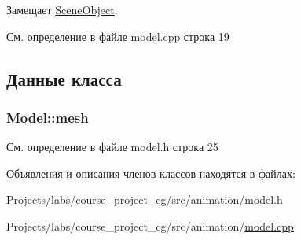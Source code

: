 Замещает \hyperlink{class_scene_object_a1b8a4b90f1200f1cd025d95964d43630}{Scene\+Object}.



См. определение в файле model.\+cpp строка 19



\subsection{Данные класса}
\subsubsection[{\texorpdfstring{mesh}{mesh}}]{ Model\+::mesh\hspace{0.3cm}{\ttfamily [private]}}\hypertarget{class_model_a3d4bb8dadc8b8fa5513cd052ccc2276e}{}\label{class_model_a3d4bb8dadc8b8fa5513cd052ccc2276e}


См. определение в файле model.\+h строка 25



Объявления и описания членов классов находятся в файлах\+:\begin{DoxyCompactItemize}
\item 
Projects/labs/course\+\_\+project\+\_\+cg/src/animation/\hyperlink{model_8h}{model.\+h}\item 
Projects/labs/course\+\_\+project\+\_\+cg/src/animation/\hyperlink{model_8cpp}{model.\+cpp}\end{DoxyCompactItemize}
